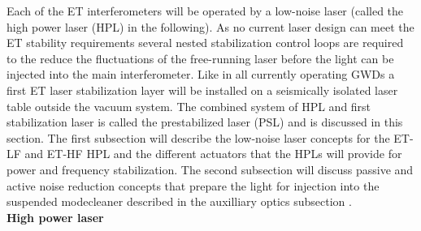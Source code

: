 \label{sec:lasers}


Each of the ET interferometers will be operated by a low-noise laser (called the high power laser (HPL) in the following). As no current laser design can meet the ET stability requirements several nested stabilization control loops are required to the reduce the fluctuations of the free-running laser before the light can be injected into the main interferometer. Like in all currently operating GWDs a first ET laser stabilization layer will be installed on a seismically isolated laser table outside the vacuum system. The combined system of HPL and first stabilization laser is called the prestabilized laser (PSL) and is discussed in this section. The first subsection will describe the low-noise laser concepts for the ET-LF and ET-HF HPL and the different actuators that the HPLs will provide for power and frequency stabilization. The second subsection will discuss passive and active noise reduction concepts that prepare the light for injection into the suspended modecleaner described in the auxilliary optics subsection %
.
\\

{\bf High power laser}


